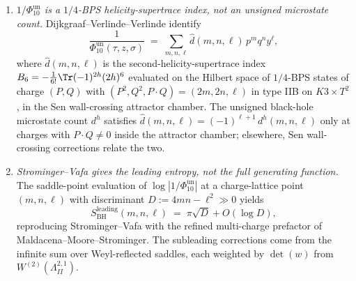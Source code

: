 \begin{remark}
\begin{enumerate}[label=\textup{(\roman*)}]
\item \emph{$1/\Phi_{10}^{\mathrm{un}}$ is a $1/4$-BPS helicity-supertrace index, not an unsigned microstate count.} Dijkgraaf--Verlinde--Verlinde identify
\[
\frac{1}{\Phi_{10}^{\mathrm{un}}(\tau, z, \sigma)} \;=\; \sum_{m, n, \ell}\widehat{d}(m, n, \ell)\, p^{m}q^{n}y^{\ell},
\]
where $\widehat{d}(m, n, \ell)$ is the second-helicity-supertrace index $B_6 = -\tfrac{1}{6!}\Tr(-1)^{2h}(2h)^6$ evaluated on the Hilbert space of $1/4$-BPS states of charge $(P, Q)$ with $(P^2, Q^2, P\cdot Q) = (2m, 2n, \ell)$ in type IIB on $K3\times T^2$, in the Sen wall-crossing attractor chamber. The unsigned black-hole microstate count $d^{h}$ satisfies $\widehat{d}(m, n, \ell) = (-1)^{\ell + 1}\,d^{h}(m, n, \ell)$ only at charges with $P\cdot Q\neq 0$ inside the attractor chamber; elsewhere, Sen wall-crossing corrections relate the two.
\item \emph{Strominger--Vafa gives the leading entropy, not the full generating function.} The saddle-point evaluation of $\log|1/\Phi_{10}^{\mathrm{un}}|$ at a charge-lattice point $(m, n, \ell)$ with discriminant $D := 4mn - \ell^{2} \gg 0$ yields
\[
S_{\mathrm{BH}}^{\mathrm{leading}}(m, n, \ell) \;=\; \pi\sqrt{D} + O(\log D),
\]
reproducing Strominger--Vafa with the refined multi-charge prefactor of Maldacena--Moore--Strominger. The subleading corrections come from the infinite sum over Weyl-reflected saddles, each weighted by $\det(w)$ from $W^{(2)}(\Lambda^{2,1}_{II})$.
\end{enumerate}
\end{remark}

